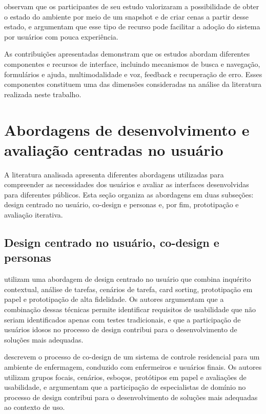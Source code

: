 \cite{kymäläinen2012creating} observam que os participantes de seu estudo valorizaram a possibilidade de obter o estado do ambiente por meio de um snapshot e de criar cenas a partir desse estado, e argumentam que esse tipo de recurso pode facilitar a adoção do sistema por usuários com pouca experiência.

As contribuições apresentadas demonstram que os estudos abordam diferentes componentes e recursos de interface, incluindo mecanismos de busca e navegação, formulários e ajuda, multimodalidade e voz, feedback e recuperação de erro. Esses componentes constituem uma das dimensões consideradas na análise da literatura realizada neste trabalho.

\section{Abordagens de desenvolvimento e avaliação centradas no usuário}

\label{sec:ucd}

A literatura analisada apresenta diferentes abordagens utilizadas para compreender as necessidades dos usuários e avaliar as interfaces desenvolvidas para diferentes públicos. Esta seção organiza as abordagens em duas subseções: design centrado no usuário, co-design e personas e, por fim, prototipação e avaliação iterativa.

\subsection{Design centrado no usuário, co-design e personas}

\label{sec:ucd_co-design}

\cite{balakrishnan2012user} utilizam uma abordagem de design centrado no usuário que combina inquérito contextual, análise de tarefas, cenários de tarefa, card sorting, prototipação em papel e prototipação de alta fidelidade. Os autores argumentam que a combinação dessas técnicas permite identificar requisitos de usabilidade que não seriam identificados apenas com testes tradicionais, e que a participação de usuários idosos no processo de design contribui para o desenvolvimento de soluções mais adequadas.

\cite{kymäläinen2012creating} descrevem o processo de co-design de um sistema de controle residencial para um ambiente de enfermagem, conduzido com enfermeiros e usuários finais. Os autores utilizam grupos focais, cenários, esboços, protótipos em papel e avaliações de usabilidade, e argumentam que a participação de especialistas de domínio no processo de design contribui para o desenvolvimento de soluções mais adequadas ao contexto de uso.

